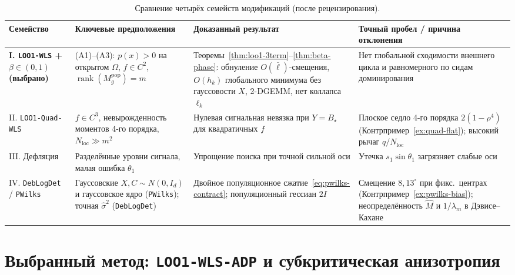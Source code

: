 \documentclass[11pt,a4paper]{article}
\numberwithin{equation}{section}
\theoremstyle{definition}
\theoremstyle{remark}
\newcommand{\rank}{\operatorname{rank}}
\begin{document}
\begin{table}[htbp]
\centering
\caption{Сравнение четырёх семейств модификаций (после рецензирования).}
\label{tab:families}
\footnotesize
\begin{tabularx}{\textwidth}{@{}L{2.7cm}YYY@{}}
\toprule
Семейство & Ключевые предположения & Доказанный результат & Точный пробел / причина отклонения \\
\midrule
\textbf{I. \texttt{LOO1-WLS} + $\beta \in (0,1)$ (выбрано)} & (A1)--(A3): $p(x)>0$ на открытом $\Omega$, $f \in C^2$, $\rank(M_g^{\mathrm{pop}})=m$ & Теоремы~\ref{thm:loo1-3term}--\ref{thm:beta-phase}: обнуление $O(\bar\ell)$-смещения, $O(h_k)$ глобального минимума без гауссовости $X$, 2-DGEMM, нет коллапса $\ell_k$ & Нет глобальной сходимости внешнего цикла и равномерного по сидам доминирования \\
II. \texttt{LOO1-Quad-WLS} & $f \in C^3$, невырожденность моментов 4-го порядка, $N_{\mathrm{loc}} \gg m^2$ & Нулевая сигнальная невязка при $Y=B_\star$ для квадратичных $f$ & Плоское седло 4-го порядка $2(1-\rho^4)$ (Контрпример~\ref{ex:quad-flat}); высокий рычаг $q/N_{\mathrm{loc}}$ \\
III. Дефляция & Разделённые уровни сигнала, малая ошибка $\theta_1$ & Упрощение поиска при точной сильной оси & Утечка $s_1 \sin\theta_1$ загрязняет слабые оси \\
IV. \texttt{DebLogDet} / \texttt{PWilks} & Гауссовские $X, C \sim N(0, I_d)$ и гауссовское ядро (\texttt{PWilks}); точная $\hat\sigma^2$ (\texttt{DebLogDet}) & Двойное популяционное сжатие~\eqref{eq:pwilks-contract}; популяционный гессиан $2I$ & Смещение $8{,}13^\circ$ при фикс.\ центрах (Контрпример~\ref{ex:pwilks-bias}); неопределённость $\widehat{M}$ и $1/\lambda_m$ в Дэвисе--Кахане \\
\bottomrule
\end{tabularx}
\end{table}

\section{Выбранный метод: \texttt{LOO1-WLS-ADP} и субкритическая анизотропия}
\label{sec:method}
\end{document}
